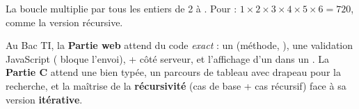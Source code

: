 \begin{remarque}
La boucle multiplie  par tous les entiers de 2 à . Pour  :
$1\times2\times3\times4\times5\times6 = 720$, comme la version récursive.
\end{remarque}

\begin{aretenir}
Au Bac TI, la \textbf{Partie web} attend du code \emph{exact} : un  (méthode,
), une validation JavaScript ( bloque l'envoi),
 +  côté serveur, et l'affichage d'un  dans
un . La \textbf{Partie C} attend une  bien typée, un parcours de
tableau avec drapeau pour la recherche, et la maîtrise de la \textbf{récursivité} (cas de
base + cas récursif) face à sa version \textbf{itérative}.
\end{aretenir}
